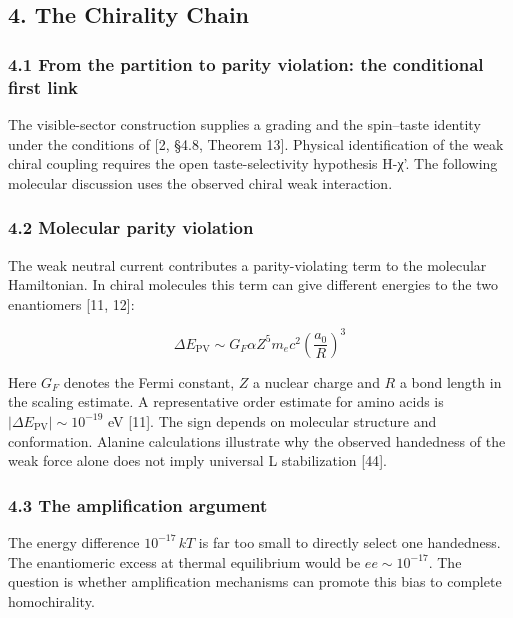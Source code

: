 \documentclass[
]{article}
\begin{document}
\hypertarget{the-chirality-chain}{%
\subsection{4. The Chirality Chain}\label{the-chirality-chain}}

\hypertarget{from-the-partition-to-parity-violation-the-conditional-first-link}{%
\subsubsection{4.1 From the partition to parity violation: the
conditional first
link}\label{from-the-partition-to-parity-violation-the-conditional-first-link}}

The visible-sector construction supplies a grading and the spin--taste
identity under the conditions of {[}2, §4.8, Theorem 13{]}. Physical
identification of the weak chiral coupling requires the open
taste-selectivity hypothesis H-χ'. The following molecular discussion
uses the observed chiral weak interaction.

\hypertarget{molecular-parity-violation}{%
\subsubsection{4.2 Molecular parity
violation}\label{molecular-parity-violation}}

The weak neutral current contributes a parity-violating term to the
molecular Hamiltonian. In chiral molecules this term can give different
energies to the two enantiomers {[}11, 12{]}:

\[\Delta E_{\text{PV}} \sim G_F \alpha Z^5 m_e c^2 \left(\frac{a_0}{R}\right)^3\]

Here \(G_F\) denotes the Fermi constant, \(Z\) a nuclear charge and
\(R\) a bond length in the scaling estimate. A representative order
estimate for amino acids is \(|\Delta E_{\text{PV}}|\sim 10^{-19}\) eV
{[}11{]}. The sign depends on molecular structure and conformation.
Alanine calculations illustrate why the observed handedness of the weak
force alone does not imply universal L stabilization {[}44{]}.

\hypertarget{the-amplification-argument}{%
\subsubsection{4.3 The amplification
argument}\label{the-amplification-argument}}

The energy difference \(10^{-17} \, kT\) is far too small to directly
select one handedness. The enantiomeric excess at thermal equilibrium
would be \(ee \sim 10^{-17}\). The question is whether amplification
mechanisms can promote this bias to complete homochirality.
\end{document}
